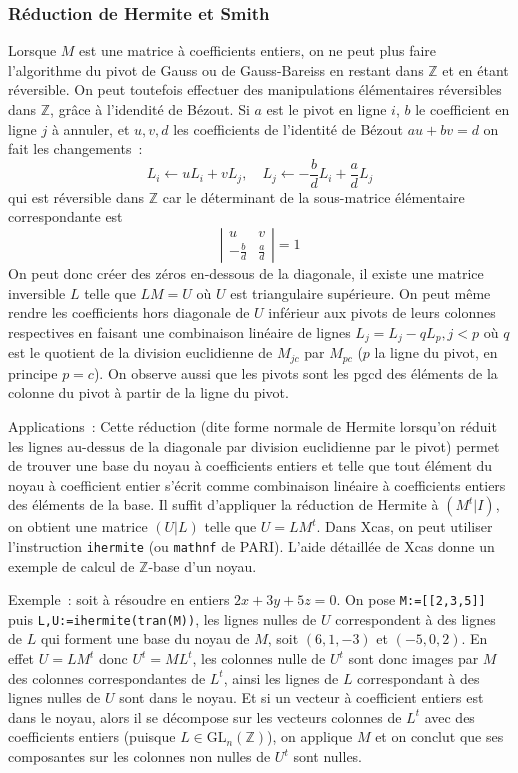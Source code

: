 \documentclass[a4paper,11pt]{article}
\newcommand{\Z}{{\mathbb{Z}}}
\begin{document}
\begin{giacjshere}
\subsubsection{R\'eduction de Hermite et Smith} 
Lorsque $M$ est une matrice \`a coefficients entiers, 
on ne peut plus faire l'algorithme du pivot de Gauss ou de
Gauss-Bareiss en restant dans $\Z$ et en \'etant r\'eversible.
On peut toutefois effectuer des manipulations \'el\'ementaires
r\'eversibles dans $\Z$, gr\^ace \`a l'idendit\'e de B\'ezout. Si $a$
est le pivot en ligne $i$, $b$ le coefficient en ligne $j$ \`a
annuler, et $u, v, d$ les coefficients de l'identit\'e de B\'ezout
$a u + b v =d$ on fait les changements~:
\[ L_i \leftarrow uL_i +v L_j, \quad 
L_j \leftarrow -\frac{b}{d} L_i + \frac{a}{d} L_j \]
qui est r\'eversible dans $\Z$
car le d\'eterminant de la sous-matrice \'el\'ementaire
correspondante est
\[ \left| \begin{array}{cc}
u & v \\
-\frac{b}{d} & \frac{a}{d}
\end{array} \right| = 1
\]
On peut donc cr\'eer des z\'eros en-dessous de la diagonale, il existe
une matrice inversible $L$ telle que $LM=U$ o\`u $U$ est triangulaire
sup\'erieure. On peut m\^eme rendre les coefficients hors diagonale
de $U$ inf\'erieur aux pivots de leurs colonnes respectives en faisant
une combinaison lin\'eaire de lignes $L_j = L_j-qL_p, j<p$ o\`u $q$
est le quotient de la division euclidienne de $M_{jc}$ par $M_{pc}$
($p$ la ligne du pivot, en principe $p=c$).
On observe aussi que les pivots sont les pgcd des \'el\'ements de la colonne
du pivot \`a partir de la ligne du pivot.

Applications~: 
Cette r\'eduction (dite forme normale de Hermite 
lorsqu'on r\'eduit les lignes
au-dessus de la diagonale par division euclidienne par
le pivot) permet de trouver une base du noyau
\`a coefficients entiers et telle que tout \'el\'ement du noyau \`a 
coefficient entier s'\'ecrit comme combinaison lin\'eaire \`a coefficients
entiers des \'el\'ements de la base. Il suffit d'appliquer la
r\'eduction de Hermite \`a $(M^t|I)$, on obtient une matrice $(U|L)$
telle que $U=LM^t$.
Dans Xcas, on peut utiliser l'instruction \verb|ihermite| (ou
\verb|mathnf| de PARI). L'aide
d\'etaill\'ee de Xcas donne un exemple de calcul de $\Z$-base
d'un noyau. 

Exemple~: soit \`a r\'esoudre en entiers $2x+3y+5z=0$.
On pose \verb|M:=[[2,3,5]]| puis 
\verb|L,U:=ihermite(tran(M))|, les lignes nulles de $U$ correspondent
\`a des lignes de $L$ qui forment une base du noyau de $M$, soit
$(6,1,-3)$ et $(-5,0,2)$.
En effet $U=L M^t$ donc $U^t=M L^t$, les colonnes nulle 
de $U^t$ sont donc images par $M$ des colonnes
correspondantes de $L^t$, ainsi les lignes de $L$ correspondant
\`a des lignes nulles de $U$ sont dans le noyau. Et si un vecteur
\`a coefficient entiers est dans le noyau, alors il se d\'ecompose
sur les vecteurs colonnes de $L^t$ avec des coefficients entiers
(puisque $L\in$GL$_n(\Z)$), on applique $M$ et on conclut
que ses composantes sur les colonnes non nulles de $U^t$ sont nulles.


\end{giacjshere}
\end{document}
